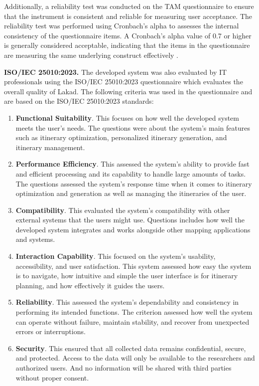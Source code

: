 Additionally, a reliability test was conducted on the TAM questionnaire to ensure that the instrument is consistent and reliable for measuring user acceptance. The reliability test was performed using Cronbach’s alpha to assesses the internal consistency of the questionnaire items. A Cronbach’s alpha value of 0.7 or higher is generally considered acceptable, indicating that the items in the questionnaire are measuring the same underlying construct effectively \parencite{Cronbach2025}.

\textbf{ISO/IEC 25010:2023.} The developed system was also evaluated by IT professionals using the ISO/IEC 25010:2023 questionnaire which evaluates the overall quality of Lakad. The following criteria was used in the questionnaire and are based on the ISO/IEC 25010:2023 standards:

\begin{enumerate}
	\item \textbf{Functional Suitability}. This focuses on how well the developed system meets the user’s needs. The questions were about the system’s main features such as itinerary optimization, personalized itinerary generation, and itinerary management.
	\item \textbf{Performance Efficiency}. This assessed the system’s ability to provide fast and efficient processing and its capability to handle large amounts of tasks. The questions assessed the system’s response time when it comes to itinerary optimization and generation as well as managing the itineraries of the user.
	\item \textbf{Compatibility}. This evaluated the system’s compatibility with other external systems that the users might use. Questions includes how well the developed system integrates and works alongside other mapping applications and systems.
	\item \textbf{Interaction Capability}. This focused on the system’s usability, accessibility, and user satisfaction. This system assessed how easy the system is to navigate, how intuitive and simple the user interface is for itinerary planning, and how effectively it guides the users.
	\item \textbf{Reliability}. This assessed the system’s dependability and consistency in performing its intended functions. The criterion assessed how well the system can operate without failure, maintain stability, and recover from unexpected errors or interruptions.
	\item \textbf{Security}.  This ensured that all collected data remains confidential, secure, and protected. Access to the data will only be available to the researchers and authorized users. And no information will be shared with third parties without proper consent.

\end{enumerate}
